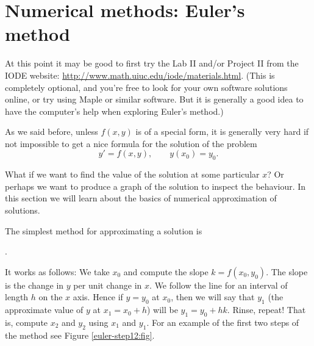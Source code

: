 \section{Numerical methods: Euler's method} \label{numer:section}

At this point it may be good to first try the
Lab II and/or Project II from the
IODE website: \href{http://www.math.uiuc.edu/iode/materials.html}{http://www.math.uiuc.edu/iode/materials.html}. (This is completely optional, and you're free to look for your own software solutions online, or try using Maple or similar software. But it is generally a good idea to have the computer's help when exploring Euler's method.)

\medskip


As we said before, unless $f(x,y)$ is of a special form,
it is generally very hard
if not impossible to get a nice formula for the solution of the problem
\begin{equation*}
y' = f(x,y), \qquad y(x_0) = y_0 .
\end{equation*}

What if we want to find the value of the solution at some particular $x$?
Or perhaps we want to produce a graph of the solution to inspect the
behaviour.  In this section we will learn about the basics of numerical
approximation of solutions.

The simplest method for approximating a solution is
%

.  

It works as follows:
We take $x_0$ and compute the slope $k = f(x_0,y_0)$.  The slope is the
change in $y$ per unit change in $x$.  We follow the line for an interval of
length $h$ on the $x$ axis.  Hence if $y = y_0$ at $x_0$, then we will say that
$y_1$ (the approximate value of $y$ at $x_1 = x_0 + h$) will be
$y_1 = y_0 + h k$.
Rinse, repeat!  That is, compute $x_2$ and $y_2$ using $x_1$ and $y_1$.
For an example of the first two steps of the method see Figure
\ref{euler-step12:fig}.


